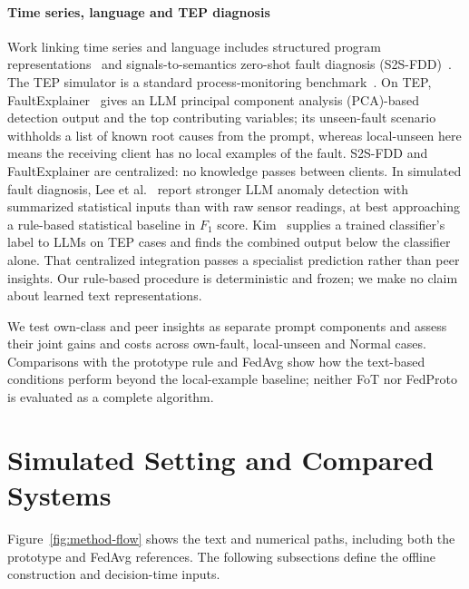 \documentclass[conference]{IEEEtran}
\newcommand{\TEP}{TEP}
\newcommand{\lu}{local-unseen}
\begin{document}
\paragraph{Time series, language and \TEP{} diagnosis}
Work linking time series and language includes structured program representations~\cite{kim2026t2sp} and signals-to-semantics zero-shot fault diagnosis (S2S-FDD)~\cite{li2025s2sfdd}. The \TEP{} simulator is a standard process-monitoring benchmark~\cite{downs1993tep,bathelt2015tep}. On \TEP{}, FaultExplainer~\cite{khan2025faultexplainer} gives an LLM principal component analysis (PCA)-based detection output and the top contributing variables; its unseen-fault scenario withholds a list of known root causes from the prompt, whereas \lu{} here means the receiving client has no local examples of the fault. S2S-FDD and FaultExplainer are centralized: no knowledge passes between clients. In simulated fault diagnosis, Lee et al.~\cite{lee2025agentic} report stronger LLM anomaly detection with summarized statistical inputs than with raw sensor readings, at best approaching a rule-based statistical baseline in $F_1$ score. Kim~\cite{kim2026complementarity} supplies a trained classifier's label to LLMs on \TEP{} cases and finds the combined output below the classifier alone. That centralized integration passes a specialist prediction rather than peer insights. Our rule-based procedure is deterministic and frozen; we make no claim about learned text representations.

We test own-class and peer insights as separate prompt components and assess their joint gains and costs across own-fault, local-unseen and Normal cases. Comparisons with the prototype rule and FedAvg show how the text-based conditions perform beyond the local-example baseline; neither FoT nor FedProto is evaluated as a complete algorithm.

\section{Simulated Setting and Compared Systems}
\label{sec:method}

Figure~\ref{fig:method-flow} shows the text and numerical paths, including both the prototype and FedAvg references. The following subsections define the offline construction and decision-time inputs.

\end{document}
